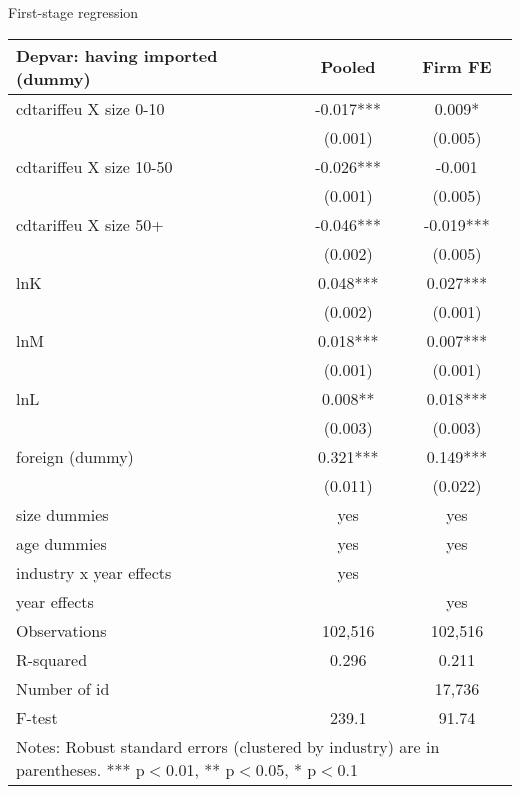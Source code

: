 \documentclass[10pt]{beamer}
\begin{document}
\begin{frame}{First-stage regression}
\begin{table}
	\renewcommand{\baselinestretch}{1.2}  \scriptsize \centering
    \begin{tabular}{lcc}
	\hline \hline
	Depvar: having imported (dummy) &  Pooled     &  Firm FE \\
	\hline
	cdtariffeu X size 0-10 & -0.017*** & 0.009* \\
	& (0.001) & (0.005) \\
	cdtariffeu X size 10-50 & -0.026*** & -0.001 \\
	& (0.001) & (0.005) \\
	cdtariffeu X size 50+ & -0.046*** & -0.019*** \\
	& (0.002) & (0.005) \\
	lnK   & 0.048*** & 0.027*** \\
	& (0.002) & (0.001) \\
	lnM   & 0.018*** & 0.007*** \\
	& (0.001) & (0.001) \\
	lnL   & 0.008** & 0.018*** \\
	& (0.003) & (0.003) \\
	foreign (dummy) & 0.321*** & 0.149*** \\
	& (0.011) & (0.022) \\
	size dummies & yes   & yes \\
	age dummies & yes   & yes \\
	industry x year effects & yes   &  \\
	year effects &       & yes \\
	Observations & 102,516 & 102,516 \\
	R-squared & 0.296 & 0.211 \\
	Number of id &       & 17,736 \\
	F-test & 239.1 & 91.74 \\
	\hline \hline
\multicolumn{3}{l}{%
	\begin{minipage}{7cm}
		\scriptsize Notes: Robust standard errors (clustered by industry) are in parentheses. *** p$<$0.01, ** p$<$0.05, * p$<$0.1%
	\end{minipage}%
}\\
\end{tabular}%
\renewcommand{\baselinestretch}{1.62}\normalsize \setlength{\baselineskip}{0.65\baselineskip}
\end{table}
\end{frame}
\end{document}
